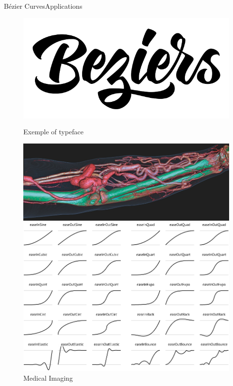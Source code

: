 \documentclass[10pt]{beamer}
\begin{document}
\begin{frame}{Bézier Curves}{Applications}
\begin{figure}[H]
\begin{minipage}{0.50\linewidth}
\begin{overprint}
\begin{center}
          \includegraphics[scale=0.25]{scripture.png}
          \caption{Exemple of typeface \footnotemark[3]}
        \end{center}
        \vspace{-3.5cm}
        \begin{center}
          \includegraphics[scale=0.20]{medical.png}
          \caption{Medical Imaging \footnotemark[4]}
        \end{center}
        \vspace{-4cm}
        \begin{center}
          \includegraphics[scale=0.17]{easing.png}

\end{center}
\end{overprint}
\end{minipage}
\end{figure}
\end{frame}
\end{document}
